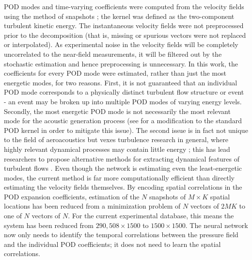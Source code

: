 POD modes and time-varying coefficients were computed from the velocity fields using the method of snapshots \citep{Sirovich1987}; the kernel was defined as the two-component turbulent kinetic energy.
The instantaneous velocity fields were not preprocessed prior to the decomposition (that is, missing or spurious vectors were not replaced or interpolated).
As experimental noise in the velocity fields will be completely uncorrelated to the near-field measurements, it will be filtered out by the stochastic estimation and hence preprocessing is unnecessary.
In this work, the coefficients for every POD mode were estimated, rather than just the most energetic modes, for two reasons.
First, it is not guaranteed that an individual POD mode corresponds to a physically distinct turbulent flow structure or event - an event may be broken up into multiple POD modes of varying energy levels.
Secondly, the most energetic POD mode is not necessarily the most relevant mode for the acoustic generation process (see \citet{Jordan2007} for a modification to the standard POD kernel in order to mitigate this issue).
The second issue is in fact not unique to the field of aeroacoustics but vexes turbulence research in general, where highly relevant dynamical processes may contain little energy \citep{Noack2008}; this has lead researchers to propose alternative methods for extracting dynamical features of turbulent flows \citep{Schmid2010}.
Even though the network is estimating even the least-energetic modes, the current method is far more computationally efficient than directly estimating the velocity fields themselves.
By encoding spatial correlations in the POD expansion coefficients, estimation of the $N$ snapshots of $M \times K$ spatial locations has been reduced from a minimization problem of $N$ vectors of $2MK$ to one of $N$ vectors of $N$.
For the current experimental database, this means the system has been reduced from $290,508 \times 1500$ to $1500 \times 1500$.
The neural network now only needs to identify the temporal correlations between the pressure field and the individual POD coefficients; it does not need to learn the spatial correlations.

